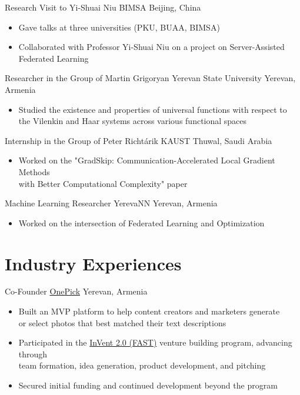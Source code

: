 \documentclass[10pt,a4paper,sans]{moderncv}        %
\newcommand{\peter}{Peter Richtárik}
\newcommand{\grigoryan}{Martin Grigoryan}
\newcommand{\kaust}{KAUST}
\newcommand{\yerevann}{YerevaNN}
\newcommand{\yerevan}{Yerevan, Armenia}
\newcommand{\thuwal}{Thuwal, Saudi Arabia}
\newcommand{\ysu}{Yerevan State University}
\begin{document}
{Research Visit to Yi-Shuai Niu}
{BIMSA}
{Beijing, China}
{}
{
  \begin{itemize}
    \item Gave talks at three universities (PKU, BUAA, BIMSA)
    \item Collaborated with Professor Yi-Shuai Niu on a project on Server-Assisted Federated Learning
  \end{itemize}
}

{Researcher in the Group of \grigoryan}
{\ysu}
{\yerevan}
{}
{
  \begin{itemize}
    \item Studied the existence and properties of universal functions with respect to\\ the Vilenkin and Haar systems across various functional spaces
  \end{itemize}
}

{Internship in the Group of \peter}
{\kaust}
{\thuwal}
{}
{
  \begin{itemize}
    \item Worked on the "GradSkip: Communication-Accelerated Local Gradient Methods\\ with Better Computational Complexity" paper
  \end{itemize}
}

{Machine Learning Researcher}
{\yerevann}
{\yerevan}
{}
{
  \begin{itemize}
    \item Worked on the intersection of Federated Learning and Optimization
  \end{itemize}
}


\section{Industry Experiences}

{Co-Founder}
{\href{https://www.crunchbase.com/organization/onepick-me\#overview}{OnePick}}
{\yerevan}
{}
{
  \begin{itemize}
    \item Built an MVP platform to help content creators and marketers generate\\
    or select photos that best matched their text descriptions
    \item Participated in the \href{https://fast.foundation/en/program/857/2023/general-information}{InVent 2.0 (FAST)} venture building program, advancing through\\
    team formation, idea generation, product development, and pitching
    \item Secured initial funding and continued development beyond the program
  \end{itemize}
} %
\end{document}
